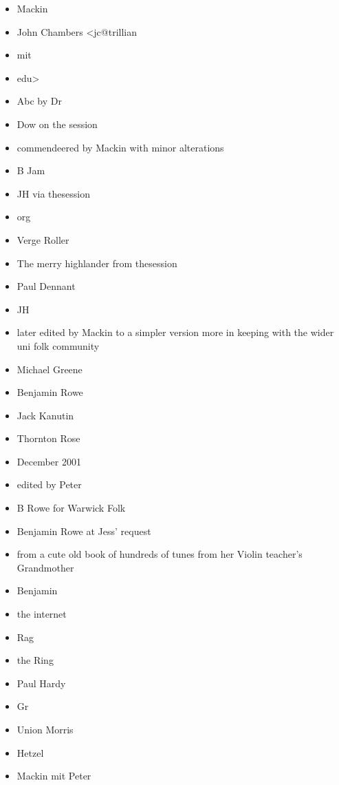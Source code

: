 \documentclass[12pt,a4paper,twoside]{article}
\begin{document}
\begin{multicols}{2}
\begin{itemize}\item Mackin
\item John Chambers <jc@trillian
\item mit
\item edu>
\item Abc by Dr
\item Dow on the session
\item commendeered by Mackin with minor alterations
\item B Jam
\item JH via thesession
\item org
\item Verge Roller
\item The merry highlander from thesession
\item Paul Dennant
\item JH
\item later edited by Mackin to a simpler version more in keeping with the wider uni folk community
\item Michael Greene
\item Benjamin Rowe
\item Jack Kanutin
\item Thornton Rose
\item December 2001
\item edited by Peter
\item B Rowe for Warwick Folk
\item Benjamin Rowe at Jess' request
\item from a cute old book of hundreds of tunes from her Violin teacher's Grandmother
\item Benjamin
\item the internet
\item Rag
\item the Ring
\item Paul Hardy
\item Gr
\item Union Morris
\item Hetzel
\item Mackin mit Peter
\end{itemize}

\end{multicols}

\newpage


\end{document}
